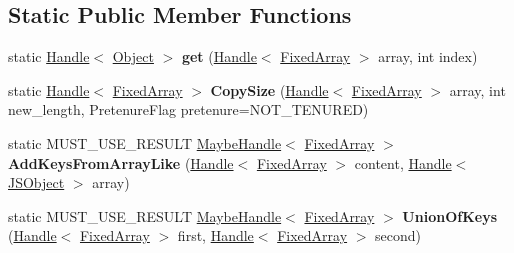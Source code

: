 \subsection*{Static Public Member Functions}
\begin{DoxyCompactItemize}
\item 
\hypertarget{classv8_1_1internal_1_1_fixed_array_aa1b74b92dc115a729d5dc2f6d2e67c83}{}static \hyperlink{classv8_1_1internal_1_1_handle}{Handle}$<$ \hyperlink{classv8_1_1internal_1_1_object}{Object} $>$ {\bfseries get} (\hyperlink{classv8_1_1internal_1_1_handle}{Handle}$<$ \hyperlink{classv8_1_1internal_1_1_fixed_array}{Fixed\+Array} $>$ array, int index)\label{classv8_1_1internal_1_1_fixed_array_aa1b74b92dc115a729d5dc2f6d2e67c83}

\item 
\hypertarget{classv8_1_1internal_1_1_fixed_array_a30ef1c5fd120cd16338315cf5c25a0fd}{}static \hyperlink{classv8_1_1internal_1_1_handle}{Handle}$<$ \hyperlink{classv8_1_1internal_1_1_fixed_array}{Fixed\+Array} $>$ {\bfseries Copy\+Size} (\hyperlink{classv8_1_1internal_1_1_handle}{Handle}$<$ \hyperlink{classv8_1_1internal_1_1_fixed_array}{Fixed\+Array} $>$ array, int new\+\_\+length, Pretenure\+Flag pretenure=N\+O\+T\+\_\+\+T\+E\+N\+U\+R\+E\+D)\label{classv8_1_1internal_1_1_fixed_array_a30ef1c5fd120cd16338315cf5c25a0fd}

\item 
\hypertarget{classv8_1_1internal_1_1_fixed_array_a48415e42dbfdbf5e0fe00b98c8797610}{}static M\+U\+S\+T\+\_\+\+U\+S\+E\+\_\+\+R\+E\+S\+U\+L\+T \hyperlink{classv8_1_1internal_1_1_maybe_handle}{Maybe\+Handle}$<$ \hyperlink{classv8_1_1internal_1_1_fixed_array}{Fixed\+Array} $>$ {\bfseries Add\+Keys\+From\+Array\+Like} (\hyperlink{classv8_1_1internal_1_1_handle}{Handle}$<$ \hyperlink{classv8_1_1internal_1_1_fixed_array}{Fixed\+Array} $>$ content, \hyperlink{classv8_1_1internal_1_1_handle}{Handle}$<$ \hyperlink{classv8_1_1internal_1_1_j_s_object}{J\+S\+Object} $>$ array)\label{classv8_1_1internal_1_1_fixed_array_a48415e42dbfdbf5e0fe00b98c8797610}

\item 
\hypertarget{classv8_1_1internal_1_1_fixed_array_ac690c68aca5dd1877008c401db2d728d}{}static M\+U\+S\+T\+\_\+\+U\+S\+E\+\_\+\+R\+E\+S\+U\+L\+T \hyperlink{classv8_1_1internal_1_1_maybe_handle}{Maybe\+Handle}$<$ \hyperlink{classv8_1_1internal_1_1_fixed_array}{Fixed\+Array} $>$ {\bfseries Union\+Of\+Keys} (\hyperlink{classv8_1_1internal_1_1_handle}{Handle}$<$ \hyperlink{classv8_1_1internal_1_1_fixed_array}{Fixed\+Array} $>$ first, \hyperlink{classv8_1_1internal_1_1_handle}{Handle}$<$ \hyperlink{classv8_1_1internal_1_1_fixed_array}{Fixed\+Array} $>$ second)\label{classv8_1_1internal_1_1_fixed_array_ac690c68aca5dd1877008c401db2d728d}


\end{DoxyCompactItemize}
